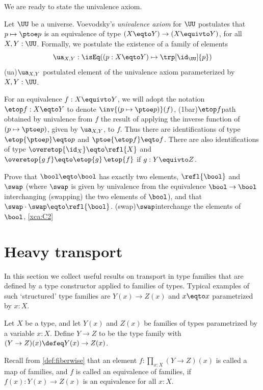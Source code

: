 We are ready to state the univalence axiom.

\begin{principle}\label{def:univalence}
    Let $\UU$ be a universe.
    Voevodsky's \emph{univalence axiom} for $\UU$
    postulates that $p\mapsto \ptoe p$ is an equivalence
    of type $(X \eqto Y) \to (X\equivto Y)$, for all $X,Y:\UU$.
    Formally, we postulate the existence of a family of elements
    \[
      \ua_{X,Y} : \isEq((p:X\eqto Y)\mapsto \trp[\id_\UU]{p})
    \]
    \glossary(ua){$\protect\ua_{X,Y}$}%
    {postulated element of the univalence axiom}%
    parameterized by $X,Y:\UU$.
\end{principle}

For an equivalence $f: X\equivto Y$, we will adopt the
notation $\etop f : X \eqto Y $ to denote $\inv{(p\mapsto\ptoe p)}(f)$,%
\glossary(1bar){$\protect\etop f$}{path obtained by univalence from $f$}
the result of applying the inverse function of $(p\mapsto\ptoe p)$,
given by $\ua_{X,Y}$, to $f$.
Thus there are identifications of type $\etop {\ptoe p} \eqto p$
and $\ptoe {\etop f} \eqto f$.  There are also identifications of
type $\overetop{\id_X} \eqto \refl{X}$
and $\overetop{g\,f} \eqto \etop{g}\,\etop{f}$ if $g: Y\equivto Z$.

\begin{xca}\label{xca:C2}
Prove that $\bool \eqto \bool$ has exactly two elements,
$\refl{\bool}$ and $\swap$ (where $\swap$ is given by
univalence from the equivalence $\bool\to\bool$ interchanging (swapping)
the two elements of $\bool$), and that $\swap\cdot\swap \eqto \refl{\bool}$.%
\glossary(swap){$\protect\swap$}{interchange the elements of $\bool$,
  \cref{xca:C2}}
\end{xca}


\section{Heavy transport}
\label{sec:heavy-transport}

In this section we collect useful results on transport in
type families that are defined by a type constructor applied
to families of types.
Typical examples of such `structured' type families are
$Y(x)\to Z(x)$ and $x \eqto x$ parametrized by $x:X$.

\begin{definition}\label{def:function-type-families}
Let $X$ be a type, and let $Y(x)$ and $Z(x)$ be families of types parametrized by a variable $x:X$.
Define $Y\to Z$ to be the type family
with $(Y\to Z)(x) \defeq Y(x)\to Z(x)$.
\end{definition}
Recall from \cref{def:fiberwise} that an element $f : \prod_{x:X}(Y\to Z)(x)$
is called a map of families,
and $f$ is called an equivalence of families,
if $f(x): Y(x)\to Z(x)$ is an equivalence for all $x:X$.

